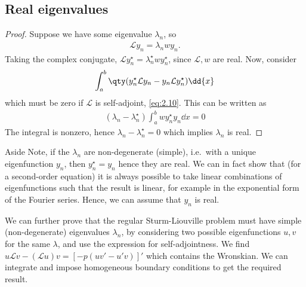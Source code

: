 \subsection{Real eigenvalues}
\begin{proof}
    Suppose we have some eigenvalue $\lambda_n$, so
    \begin{align} \label{eq:2.12}
        \mathcal L y_n = \lambda_n w y_n.
    \end{align} 
    Taking the complex conjugate, $\mathcal L y_n^\star = \lambda_n^\star w y_n^\star$, since $\mathcal L, w$ are real.
    Now, consider
    \begin{align*}
        \int_a^b \qty(y_n^\star \mathcal L y_n - y_n \mathcal L y_n^\star) \dd{x}
    \end{align*}
    which must be zero if $\mathcal L$ is self-adjoint, \cref{eq:2.10}.
    This can be written as
    \begin{align*}
        (\lambda_n - \lambda_n^\star) \int_a^b w y_n^\star y_n \dd{x} = 0
    \end{align*}
    The integral is nonzero, hence $\lambda_n - \lambda_n^\star = 0$ which implies $\lambda_n$ is real.
\end{proof}

\begin{aside}{Aside}
    Note, if the $\lambda_n$ are non-degenerate (simple), i.e.\ with a unique eigenfunction $y_n$, then $y_n^\star = y_n$ hence they are real.
    We can in fact show that (for a second-order equation) it is always possible to take linear combinations of eigenfunctions such that the result is linear, for example in the exponential form of the Fourier series.
    Hence, we can assume that $y_n$ is real.

    We can further prove that the regular Sturm-Liouville problem must have simple (non-degenerate) eigenvalues $\lambda_n$, by considering two possible eigenfunctions $u, v$ for the same $\lambda$, and use the expression for self-adjointness.
    We find $u \mathcal L v - (\mathcal L u) v = [-p(uv' - u'v)]'$ which contains the Wronskian.
    We can integrate and impose homogeneous boundary conditions to get the required result.
\end{aside} 

